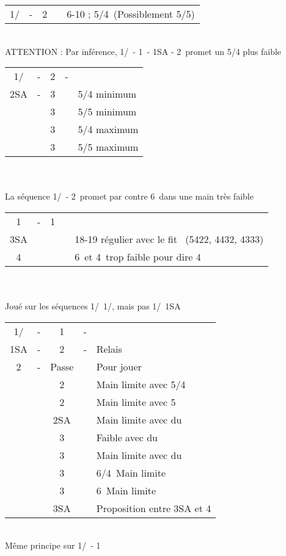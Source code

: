 \documentclass[a4paper, oneside, 11pt]{report}
\begin{document}
		\begin{tabular}{cccc|l}
		1\trefle/\carreau & - & 2\coeur && 6-10 ; 5\pique/4\coeur\ (Possiblement 5/5)\\
		\end{tabular}\\
		ATTENTION : Par inférence, 1\trefle/\carreau\ - 1\pique\ - 1SA - 2\coeur\ promet un 5/4 plus faible\\
	
		\begin{tabular}{cccc|l}
		1\trefle/\carreau & - & 2\coeur & - &\\
		2SA & - & 3\trefle && 5/4 minimum\\
		&& 3\carreau && 5/5 minimum\\
		&& 3\coeur && 5/4 maximum\\
		&& 3\pique && 5/5 maximum\\
		\end{tabular}\\\\
	
		La séquence 1\trefle/\carreau\ - 2\pique\ promet par contre 6\pique\ dans une main très faible\\

		\begin{tabular}{cccc|l}
		1\trefle & - & 1\coeur &&\\
		3SA &&&& 18-19 régulier avec le fit \coeur\ (5422, 4432, 4333)\\
		4\coeur &&&& 6\trefle\ et 4\coeur\ trop faible pour dire 4\trefle\\
		\end{tabular}\\\\

		Joué sur les séquences 1\trefle/\carreau\ 1\coeur/\pique,  mais pas 1\trefle/\carreau\ 1SA\\

		\begin{tabular}{cccc|l}
		1\trefle/\carreau & - & 1\pique & - &\\
		1SA & - & 2\trefle & - & Relais\\
		2\carreau & - & Passe && Pour jouer\\
		&& 2\coeur && Main limite avec 5\pique/4\coeur\\
		&& 2\pique && Main limite avec 5\pique\\
		&& 2SA && Main limite avec du \trefle\\
		&& 3\trefle && Faible avec du \trefle\\
		&& 3\carreau && Main limite avec du \carreau\\
		&& 3\coeur && 6\pique/4\coeur\ Main limite\\
		&& 3\pique && 6\pique\ Main limite\\
		&& 3SA && Proposition entre 3SA et 4\pique\\
		\end{tabular}\\
		Même principe sur 1\trefle/\carreau\ - 1\coeur\\
		
\end{document}
